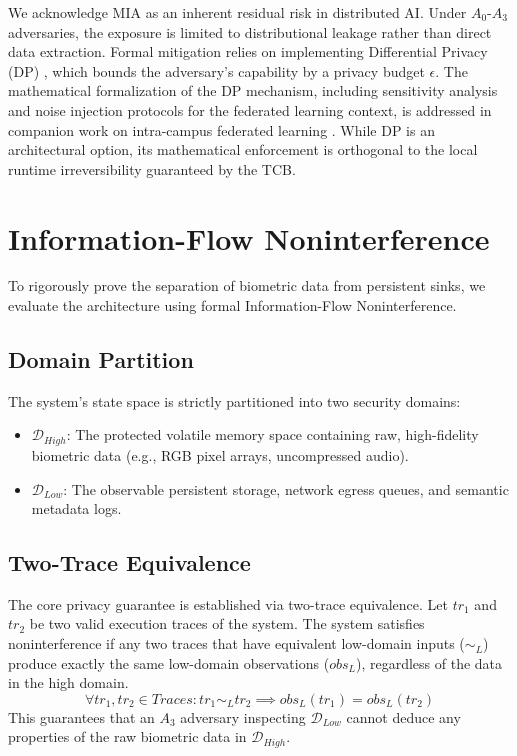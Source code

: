\documentclass[conference]{IEEEtran}
\begin{document}
We acknowledge MIA as an inherent residual risk in distributed AI. Under $A_0$-$A_3$ adversaries, the exposure is limited to distributional leakage rather than direct data extraction. Formal mitigation relies on implementing Differential Privacy (DP) \cite{b14, b22}, which bounds the adversary's capability by a privacy budget $\epsilon$. The mathematical formalization of the DP mechanism, including sensitivity analysis and noise injection protocols for the federated learning context, is addressed in companion work on intra-campus federated learning \cite{b14, b22}. While DP is an architectural option, its mathematical enforcement is orthogonal to the local runtime irreversibility guaranteed by the TCB.

\section{Information-Flow Noninterference}

To rigorously prove the separation of biometric data from persistent sinks, we evaluate the architecture using formal Information-Flow Noninterference.

\subsection{Domain Partition}
The system's state space is strictly partitioned into two security domains:
\begin{itemize}
    \item $\mathcal{D}_{High}$: The protected volatile memory space containing raw, high-fidelity biometric data (e.g., RGB pixel arrays, uncompressed audio).
    \item $\mathcal{D}_{Low}$: The observable persistent storage, network egress queues, and semantic metadata logs.
\end{itemize}

\subsection{Two-Trace Equivalence}
The core privacy guarantee is established via two-trace equivalence. Let $tr_1$ and $tr_2$ be two valid execution traces of the system. The system satisfies noninterference if any two traces that have equivalent low-domain inputs ($\sim_L$) produce exactly the same low-domain observations ($obs_L$), regardless of the data in the high domain.
\begin{equation}
\forall tr_1, tr_2 \in Traces : tr_1 \sim_L tr_2 \implies obs_L(tr_1) = obs_L(tr_2)
\end{equation}
This guarantees that an $A_3$ adversary inspecting $\mathcal{D}_{Low}$ cannot deduce any properties of the raw biometric data in $\mathcal{D}_{High}$.
\end{document}
